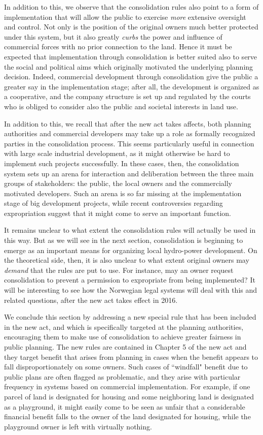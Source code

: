 \documentclass[10pt]{article} %
\begin{document}
In addition to this, we observe that the consolidation rules also point to a form of implementation that will allow the public to exercise \emph{more} extensive oversight and control. Not only is the position of the original owners much better protected under this system, but it also greatly \emph{curbs} the power and influence of commercial forces with no prior connection to the land. Hence it must be expected that implementation through consolidation is better suited also to serve the social and political aims which originally motivated the underlying planning decision. Indeed, commercial development through consolidation give the public a greater say in the implementation stage; after all, the development is organized as a cooperative, and the company structure is set up and regulated by the courts who is obliged to consider also the public and societal interests in land use.

In addition to this, we recall that after the new act takes affects, both planning authorities and commercial developers may take up a role as formally recognized parties in the consolidation process. This seems particularly useful in connection with large scale industrial development, as it might otherwise be hard to implement such projects successfully. In these cases, then, the consolidation system sets up an arena for interaction and deliberation between the three main groups of stakeholders: the public, the local owners and the commercially motivated developers. Such an arena is so far missing at the implementation stage of big development projects, while recent controversies regarding expropriation suggest that it might come to serve an important function.

It remains unclear to what extent the consolidation rules will actually be used in this way. But as we will see in the next section, consolidation is beginning to emerge as an important means for organizing local hydro-power development. On the theoretical side, then, it is also unclear to what extent original owners may \emph{demand} that the rules are put to use. For instance, may an owner request consolidation to prevent a permission to expropriate from being implemented? It will be interesting to see how the Norwegian legal systems will deal with this and related questions, after the new act takes effect in 2016.

We conclude this section by addressing a new special rule that has been included in the new act, and which is specifically targeted at the planning authorities, encouraging them to make use of consolidation to achieve  greater fairness in public planning. The new rules are contained in Chapter 5 of the new act and they target benefit that arises from planning in cases when the benefit appears to fall disproportionately on some owners. Such cases of ``windfall" benefit due to public plans are often flagged as problematic, and they arise with particular frequency in systems based on commercial implementation. For example, if one parcel of land is designated for housing and some neighboring land is designated as a playground, it might easily come to be seen as unfair that a considerable financial benefit falls to the owner of the land designated for housing, while the playground owner is left with virtually nothing.
\end{document}
